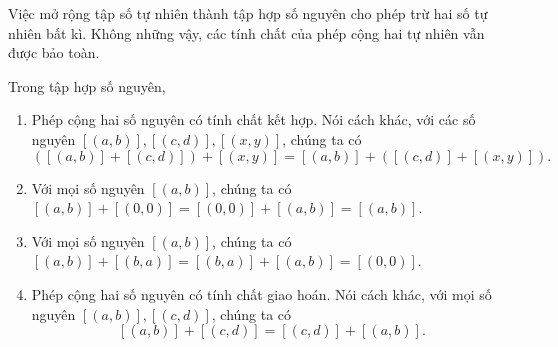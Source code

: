 Việc mở rộng tập số tự nhiên thành tập hợp số nguyên cho phép trừ hai số tự nhiên bất kì. Không những vậy, các tính chất của phép cộng hai tự nhiên vẫn được bảo toàn.
\begin{theorem}\label{theorem:group-of-integers}
	Trong tập hợp số nguyên,
	\begin{enumerate}[label={(\roman*)}]
		\item Phép cộng hai số nguyên có tính chất kết hợp. Nói cách khác, với các số nguyên $[(a, b)], [(c, d)], [(x, y)]$, chúng ta có
		      \[
			      ([(a, b)] + [(c, d)]) + [(x, y)] = [(a, b)] + ([(c, d)] + [(x, y)]).
		      \]
		\item Với mọi số nguyên $[(a, b)]$, chúng ta có $[(a, b)] + [(0, 0)] = [(0, 0)] + [(a, b)] = [(a, b)]$.
		\item Với mọi số nguyên $[(a, b)]$, chúng ta có $[(a, b)] + [(b, a)] = [(b, a)] + [(a, b)] = [(0, 0)]$.
		\item Phép cộng hai số nguyên có tính chất giao hoán. Nói cách khác, với mọi số nguyên $[(a, b)], [(c, d)]$, chúng ta có
		      \[
			      [(a, b)] + [(c, d)] = [(c, d)] + [(a, b)].
		      \]
	\end{enumerate}
\end{theorem}

